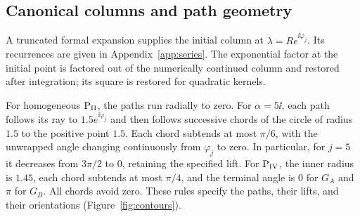 \subsection{Canonical columns and path geometry}
A truncated formal expansion supplies the initial column at
$\lambda=R e^{\ii\varphi_j}$. Its recurrences are given in
Appendix~\ref{app:series}. The exponential factor at the initial point
is factored out of the numerically continued column and restored after
integration; its square is restored for quadratic kernels.

For homogeneous $\mathrm{P}_{\mathrm{II}}$, the paths run radially to zero.
For $\alpha=5\ii$, each path follows its ray to
$1.5e^{\ii\varphi_j}$ and then follows successive chords of the circle
of radius $1.5$ to the positive point $1.5$. Each chord subtends at most
$\pi/6$, with the unwrapped angle changing continuously from
$\varphi_j$ to zero. In particular, for $j=5$ it decreases from
$3\pi/2$ to $0$, retaining the specified lift.
For $\mathrm{P}_{\mathrm{IV}}$, the inner radius is $1.45$, each chord subtends at most
$\pi/4$, and the terminal angle is $0$ for $G_A$ and $\pi$ for $G_B$.
All chords avoid zero. These rules specify the paths, their lifts,
and their orientations (Figure~\ref{fig:contours}).

